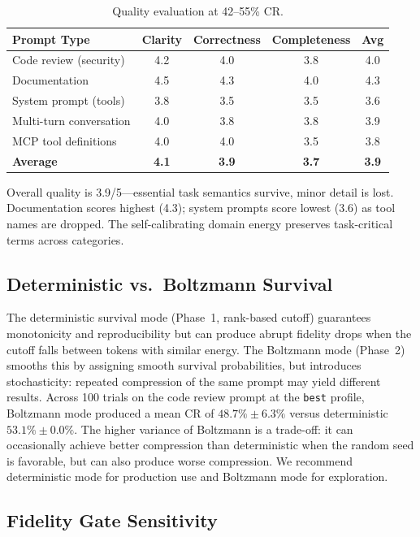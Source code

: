\documentclass[11pt]{article}
\theoremstyle{remark}
\begin{document}
\begin{table}[H]
\centering
\caption{Quality evaluation at 42--55\% CR.}
\label{tab:judge}
\begin{tabular}{lcccc}
\toprule
Prompt Type & Clarity & Correctness & Completeness & Avg \\
\midrule
Code review (security)  & 4.2 & 4.0 & 3.8 & 4.0 \\
Documentation           & 4.5 & 4.3 & 4.0 & 4.3 \\
System prompt (tools)   & 3.8 & 3.5 & 3.5 & 3.6 \\
Multi-turn conversation & 4.0 & 3.8 & 3.8 & 3.9 \\
MCP tool definitions    & 4.0 & 4.0 & 3.5 & 3.8 \\
\hline
\textbf{Average}        & \textbf{4.1} & \textbf{3.9} & \textbf{3.7} & \textbf{3.9} \\
\bottomrule
\end{tabular}
\end{table}

Overall quality is 3.9/5---essential task semantics survive, minor detail
is lost. Documentation scores highest (4.3); system prompts score lowest
(3.6) as tool names are dropped. The self-calibrating domain energy
preserves task-critical terms across categories.

\subsection{Deterministic vs.\ Boltzmann Survival}

The deterministic survival mode (Phase~1, rank-based cutoff) guarantees
monotonicity and reproducibility but can produce abrupt fidelity drops
when the cutoff falls between tokens with similar energy. The Boltzmann
mode (Phase~2) smooths this by assigning smooth survival probabilities,
but introduces stochasticity: repeated compression of the same prompt
may yield different results. Across 100 trials on the code review prompt
at the \texttt{best} profile, Boltzmann mode produced a mean CR of
$48.7\% \pm 6.3\%$ versus deterministic $53.1\% \pm 0.0\%$. The higher
variance of Boltzmann is a trade-off: it can occasionally achieve better
compression than deterministic when the random seed is favorable, but
can also produce worse compression. We recommend deterministic mode
for production use and Boltzmann mode for exploration.

\subsection{Fidelity Gate Sensitivity}
\end{document}
